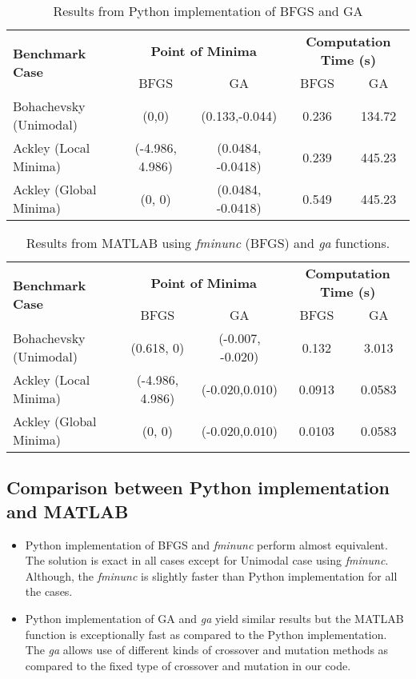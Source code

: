 \documentclass[12pt,a4paper,oneside]{paper} %
\begin{document}
\begin{table}[H]
    \centering
    \begin{tabular}{|p{}|c|c|c|c|}
        \hline
        \multirow{2}{*}{\textbf{Benchmark Case}} & \multicolumn{2}{|c|}{\textbf{Point of Minima}} & \multicolumn{2}{c|}{\textbf{Computation Time (s)}} \\ \cline{2-5}
        & BFGS & GA & BFGS & GA \\ \hline
        Bohachevsky (Unimodal) & (0,0) & (0.133,-0.044) & 0.236 & 134.72\\ \hline
        Ackley (Local Minima) & (-4.986, 4.986) & (0.0484, -0.0418) & 0.239 & 445.23\\ \hline
        Ackley (Global Minima) & (0, 0) & (0.0484, -0.0418) & 0.549 & 445.23\\ \hline
    \end{tabular}
    \caption{Results from Python implementation of BFGS and GA}
    \label{tab:pythonCode}
\end{table}

\begin{table}[H]
    \centering
    \begin{tabular}{|p{}|c|c|c|c|}
        \hline
        \multirow{2}{*}{\textbf{Benchmark Case}} & \multicolumn{2}{|c|}{\textbf{Point of Minima}} & \multicolumn{2}{c|}{\textbf{Computation Time (s)}} \\ \cline{2-5}
        & BFGS & GA & BFGS & GA \\ \hline
        Bohachevsky (Unimodal) & (0.618, 0) & (-0.007, -0.020) & 0.132 & 3.013\\ \hline
        Ackley (Local Minima) & (-4.986, 4.986) & (-0.020,0.010) & 0.0913 & 0.0583\\ \hline
        Ackley (Global Minima) & (0, 0) & (-0.020,0.010) & 0.0103 & 0.0583\\ \hline
    \end{tabular}
    \caption{Results from MATLAB using \emph{fminunc} (BFGS) and \emph{ga} functions.}
    \label{tab:matlabCode}
\end{table}

\subsection{Comparison between Python implementation and MATLAB}
\begin{itemize}
    \item Python implementation of BFGS and \emph{fminunc} perform almost equivalent. The solution is exact in all cases except for Unimodal case using \emph{fminunc}. Although, the \emph{fminunc} is slightly faster than Python implementation for all the cases.
    \item Python implementation of GA and \emph{ga} yield similar results but the MATLAB function is exceptionally fast as compared to the Python implementation. The \emph{ga} allows use of different kinds of crossover and mutation methods as compared to the fixed type of crossover and mutation in our code.
\end{itemize}
\end{document}
